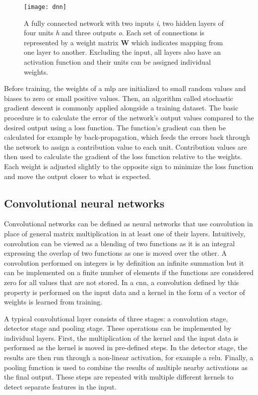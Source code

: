 \begin{figure}[H]
\centering
\texttt{[image: dnn]}
\caption{A fully connected network with two inputs \textit{i}, two hidden layers of four units \textit{h} and three outputs \textit{o}. Each set of connections is represented by a weight matrix \textbf{W} which indicates mapping from one layer to another. Excluding the input, all layers also have an activation function and their units can be assigned individual weights.}\label{fig:fcon}
\end{figure}

Before training, the weights of a \ac{mlp} are initialized to small random values and biases to zero or small positive values. Then, an algorithm called stochastic gradient descent is commonly applied alongside a training dataset. The basic procedure is to calculate the error of the network's output values compared to the desired output using a loss function. The function's gradient can then be calculated for example by back-propagation, which feeds the errors back through the network to assign a contribution value to each unit. Contribution values are then used to calculate the gradient of the loss function relative to the weights. Each weight is adjusted slightly to the opposite sign to minimize the loss function and move the output closer to what is expected.

\subsection{Convolutional neural networks}\label{ssec:dlcnn}
Convolutional networks can be defined as neural networks that use convolution in place of general matrix multiplication in at least one of their layers. Intuitively, convolution can be viewed as a blending of two functions as it is an integral expressing the overlap of two functions as one is moved over the other. A convolution performed on integers is by definition an infinite summation but it can be implemented on a finite number of elements if the functions are considered zero for all values that are not stored. In a \ac{cnn}, a convolution defined by this property is performed on the input data and a kernel in the form of a vector of weights is learned from training.

A typical convolutional layer consists of three stages: a convolution stage, detector stage and pooling stage. These operations can be implemented by individual layers. First, the multiplication of the kernel and the input data is performed as the kernel is moved in pre-defined steps. In the detector stage, the results are then run through a non-linear activation, for example a \ac{relu}. Finally, a pooling function is used to combine the results of multiple nearby activations as the final output. These steps are repeated with multiple different kernels to detect separate features in the input.

